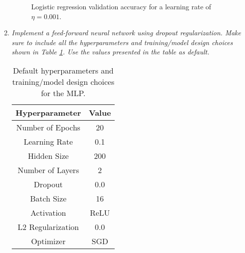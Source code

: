 \documentclass[12pt]{article}
\begin{document}
\begin{enumerate}[leftmargin=\labelsep]
          \begin{figure}[H]
              \centering
              
              \caption{Logistic regression validation accuracy for a learning rate of $\eta = 0.001$.}
              \label{fig:q2-logistic_regression-validation-accuracy-batch-16-lr-0.001-epochs-20-l2-0.0-opt-sgd}
          \end{figure}

          \vspace{12pt}

    \item \textit{Implement a feed-forward neural network using dropout regularization. Make
              sure to include all the hyperparameters and training/model design choices shown in Table
                  {\ref{tab:mlp-default}}. Use the values presented in the table as default.}

          \begin{table}[H]
              \centering
              \begin{tabular}{|c|c|}
                  \hline
                  \textbf{Hyperparameter} & \textbf{Value} \\ \hline
                  Number of Epochs        & 20             \\ \hline
                  Learning Rate           & 0.1            \\ \hline
                  Hidden Size             & 200            \\ \hline
                  Number of Layers        & 2              \\ \hline
                  Dropout                 & 0.0            \\ \hline
                  Batch Size              & 16             \\ \hline
                  Activation              & ReLU           \\ \hline
                  L2 Regularization       & 0.0            \\ \hline
                  Optimizer               & SGD            \\ \hline
              \end{tabular}
              \caption{Default hyperparameters and training/model design choices for the MLP.}
              \label{tab:mlp-default}
          \end{table}


\end{enumerate}
\end{document}
